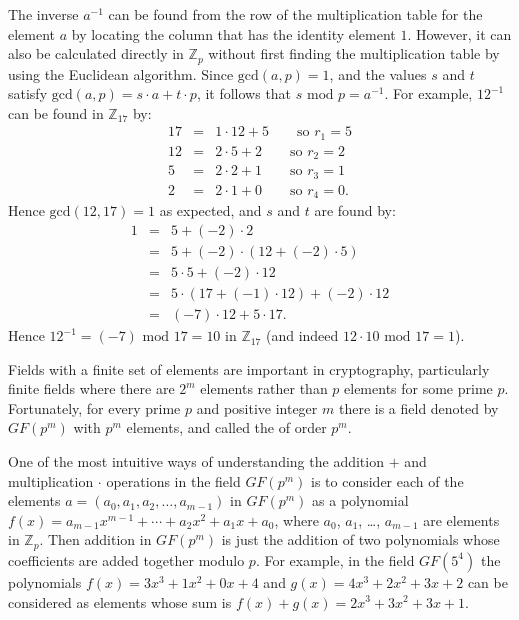 The inverse $a^{-1}$ can be found from the row of the multiplication table for the element
$a$ by locating the column that has the identity element $1$.
However, it can also be calculated directly in $\mathbb{Z}_p$
without first finding the multiplication
table by using the Euclidean algorithm.
Since $\mbox{gcd}(a,p)=1$, and the values $s$ and $t$ satisfy
$\mbox{gcd}(a,p)=s\cdot a+t\cdot p$, it follows that $s\mbox{ mod }p=a^{-1}$.
For example, ${12}^{-1}$ can be found in $\mathbb{Z}_{17}$ by:
\begin{eqnarray*}
  17 &=& 1\cdot12+5 \qquad\mbox{so $r_1=5$} \\
  12 &=& 2\cdot5+2 \qquad\mbox{so $r_2=2$} \\
  5 &=& 2\cdot2+1 \qquad\mbox{so $r_3=1$} \\
  2 &=& 2\cdot1+0 \qquad\mbox{so $r_4=0$}.
\end{eqnarray*}
Hence $\mbox{gcd}(12,17)=1$ as expected, and $s$ and $t$ are found by:
\begin{eqnarray*}
  1 &=& 5 + (-2)\cdot2 \\
  &=& 5 + (-2)\cdot(12+(-2)\cdot5) \\
  &=& 5\cdot5+(-2)\cdot12 \\
  &=& 5\cdot(17+(-1)\cdot12)+(-2)\cdot12 \\
  &=& (-7)\cdot12+5\cdot17.
\end{eqnarray*}
Hence ${12}^{-1}=(-7)\mbox{ mod }17=10$ in $\mathbb{Z}_{17}$
(and indeed $12\cdot10\mbox{ mod }17=1$).

Fields with a finite set of elements are important in cryptography,
particularly finite fields where there are $2^m$ elements rather than
$p$ elements for some prime $p$.
Fortunately, for every prime $p$ and positive integer $m$ there is a field denoted by
$GF(p^m)$ with $p^m$ elements,
and called the  of order $p^m$.

One of the most intuitive ways of understanding the addition $+$ and
multiplication $\cdot$ operations in the field $GF(p^m)$
is to consider each of the elements
$a=\left(a_0,a_1,a_2,\ldots,a_{m-1}\right)$ in $GF(p^m)$ as a polynomial
$f(x)=a_{m-1}x^{m-1}+\cdots+a_2x^2+a_1x+a_0$,
where $a_0$, $a_1$, \dots, $a_{m-1}$ are elements in $\mathbb{Z}_p$.
Then addition in $GF(p^m)$ is just the addition of two polynomials
whose coefficients are added together modulo $p$.
For example, in the field $GF(5^4)$ the polynomials
$f(x)=3x^3+1x^2+0x+4$ and $g(x)=4x^3+2x^2+3x+2$
can be considered as elements whose sum is
$f(x)+g(x)=2x^3+3x^2+3x+1$.

